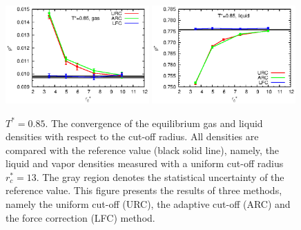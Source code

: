 \documentclass[aps,pre,preprint]{revtex4-1}
\begin{document}
\begin{figure}
  \centering
  \includegraphics[width=0.49\textwidth]{fig/converge.new/t0.85.gas.eps} 
  \includegraphics[width=0.49\textwidth]{fig/converge.new/t0.85.liquid.eps} 
  \caption{$T^\ast = 0.85$. The convergence of the equilibrium gas and
    liquid densities with respect to the cut-off radius. All densities
    are compared with the reference value (black solid line), namely,
    the liquid and vapor densities measured with a uniform cut-off
    radius $r_c^\ast=13$. The gray region denotes the statistical
    uncertainty of the reference value.  This figure presents the
    results of three methods, namely the uniform cut-off (URC), the
    adaptive cut-off (ARC) and the force correction (LFC) method. }
  \label{fig:tmp5}
\end{figure}
\end{document}
